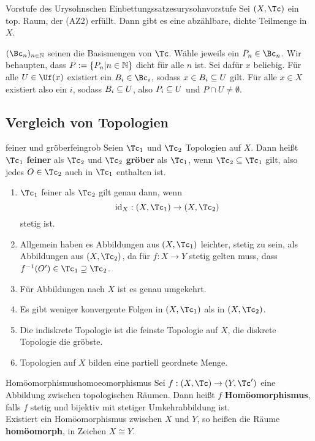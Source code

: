 \begin{satz}{Vorstufe des Urysohnschen Einbettungssatzes}{urysohnvorstufe}
Sei $(X, \Tc)$ ein top. Raum, der (AZ2) erfüllt. Dann gibt es eine abzählbare, dichte Teilmenge in $X$.
\end{satz}
\begin{beweis}
$(\Bc_n)_{n \in \N}$ seinen die Basismengen von $\Tc$. Wähle jeweils ein $P_n \in \Bc_n$. Wir behaupten, dass $P := \{P_n | n \in \mathbb{N} \}$ dicht für alle $n$ ist. Sei dafür $x$ beliebig. Für alle $U \in \Uf(x)$ existiert ein $B_i \in \Bc_i$, sodass $x \in B_i \subseteq U$ gilt. Für alle $x \in X$ existiert also ein $i$, sodass $B_i \subseteq U$, also $P_i \subseteq U$ und $P \cap U \neq \emptyset$.
\end{beweis}
\subsection{Vergleich von Topologien}
\label{subsec:vergleichvontopo}
\begin{definition}{feiner und gröber}{feingrob}
Seien $\Tc_1$ und $\Tc_2$ Topologien auf $X$. Dann heißt $\Tc_1$ \textbf{feiner} als $\Tc_2$ und $\Tc_2$ \textbf{gröber} als $\Tc_1$, wenn $\Tc_2 \sub \Tc_1$ gilt, also jedes $O \in \Tc_2$ auch in $\Tc_1$ enthalten ist.
\end{definition}
\begin{bemerkungen}
\begin{enumerate}
\item $\Tc_1$ feiner als $\Tc_2$ gilt genau dann, wenn 
\begin{equation}
\id_X: (X, \Tc_1) \to (X, \Tc_2)
\end{equation}
stetig ist.
\item Allgemein haben es Abbildungen aus $(X, \Tc_1)$ leichter, stetig zu sein, als Abbildungen aus $(X, \Tc_2)$, da für $f: X \to Y$ stetig gelten muss, dass $f^{-1}(O') \in \Tc_1 \supseteq \Tc_2$.
\item Für Abbildungen nach $X$ ist es genau umgekehrt.
\item Es gibt weniger konvergente Folgen in $(X,\Tc_1)$ als in $(X, \Tc_2)$.
\item Die indiskrete Topologie ist die feinste Topologie auf $X$, die diskrete Topologie die gröbste.
\item Topologien auf $X$ bilden eine partiell geordnete Menge.
\end{enumerate}
\end{bemerkungen}
\begin{definition}{Homöomorphismus}{homoeomorphismus}
Sei $f: (X, \Tc) \to (Y, \Tc')$ eine Abbildung zwischen topologischen Räumen. Dann heißt $f$ \textbf{Homöomorphismus}, falls $f$ stetig und bijektiv mit stetiger Umkehrabbildung ist.\\
Existiert ein Homöomorphismus zwischen $X$ und $Y$, so heißen die Räume \textbf{homöomorph}, in Zeichen $X \cong Y$.
\end{definition}
